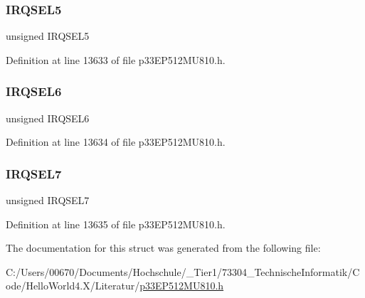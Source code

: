 \subsubsection{\texorpdfstring{I\+R\+Q\+S\+E\+L5}{IRQSEL5}}
{\footnotesize\ttfamily unsigned I\+R\+Q\+S\+E\+L5}



Definition at line 13633 of file p33\+E\+P512\+M\+U810.\+h.

\mbox{\label{structtag_d_m_a13_r_e_q_b_i_t_s_ace52408ef8c29561f3c56a3fbcbc8217}} 
\subsubsection{\texorpdfstring{I\+R\+Q\+S\+E\+L6}{IRQSEL6}}
{\footnotesize\ttfamily unsigned I\+R\+Q\+S\+E\+L6}



Definition at line 13634 of file p33\+E\+P512\+M\+U810.\+h.

\mbox{\label{structtag_d_m_a13_r_e_q_b_i_t_s_acce7dedecdf1f53cdbead3edf7c5d53a}} 
\subsubsection{\texorpdfstring{I\+R\+Q\+S\+E\+L7}{IRQSEL7}}
{\footnotesize\ttfamily unsigned I\+R\+Q\+S\+E\+L7}



Definition at line 13635 of file p33\+E\+P512\+M\+U810.\+h.



The documentation for this struct was generated from the following file\+:\begin{DoxyCompactItemize}
\item 
C\+:/\+Users/00670/\+Documents/\+Hochschule/\+\_\+\+Tier1/73304\+\_\+\+Technische\+Informatik/\+Code/\+Hello\+World4.\+X/\+Literatur/\hyperlink{p33_e_p512_m_u810_8h}{p33\+E\+P512\+M\+U810.\+h}\end{DoxyCompactItemize}
